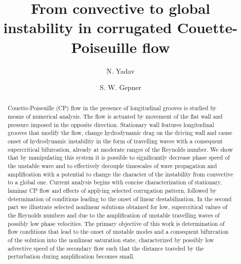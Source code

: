 \documentclass[lineno]{jfm}
\title{From convective to global instability in corrugated Couette-Poiseuille flow}
\author
{
 N. Yadav\aff{1} \and
 S. W. Gepner\aff{1} \corresp{\email{stanislaw.gepner@pw.edu.pl}}
}
\affiliation{\aff{1}Warsaw University of Technology, Institute of Aeronautics and Applied Mechanics, Nowowiejska 24, 00-665 Warsaw, Poland}
\begin{document}
\maketitle

\begin{abstract}
Couette-Poiseuille (CP) flow in the presence of longitudinal grooves is studied by means of numerical analysis. The flow is actuated by movement of the flat wall and pressure imposed in the opposite direction. Stationary wall features longitudinal grooves that modify the flow, change hydrodynamic drag on the driving wall and cause onset of hydrodynamic instability in the form of travelling waves with a consequent supercritical bifurcation, already at moderate ranges of the Reynolds number. We show that by manipulating this system it is possible to significantly decrease phase speed of the unstable wave and to effectively decouple timescales of wave propagation and amplification with a potential to change the character of the instability from convective to a global one. Current analysis begins with concise characterization of stationary, laminar CP flow and effects of applying selected corrugation pattern, followed by determination of conditions leading to the onset of linear destabilization. In the second part we illustrate selected nonlinear solutions obtained for low, supercritical values of the Reynolds numbers and due to the amplification of unstable travelling waves of possibly low phase velocities. The primary objective of this work is determination of flow conditions that lead to the onset of unstable modes and a consequent bifurcation of the solution into the nonlinear saturation state, characterized by possibly low advective speed of the secondary flow such that the distance traveled by the perturbation during amplification becomes small.
\end{abstract}

\end{document}
